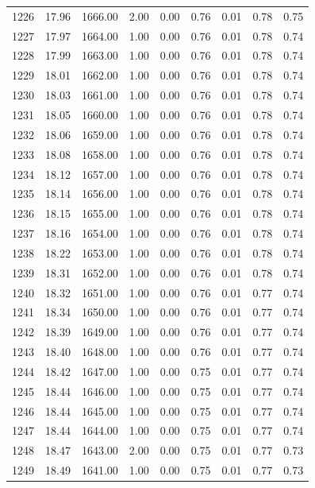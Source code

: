 \documentclass{article}\usepackage[]{graphicx}\usepackage[]{color}
\begin{document}
\begin{longtable}{rrrrrrrrr}
  1226 & 17.96 & 1666.00 & 2.00 & 0.00 & 0.76 & 0.01 & 0.78 & 0.75 \\ 
  1227 & 17.97 & 1664.00 & 1.00 & 0.00 & 0.76 & 0.01 & 0.78 & 0.74 \\ 
  1228 & 17.99 & 1663.00 & 1.00 & 0.00 & 0.76 & 0.01 & 0.78 & 0.74 \\ 
  1229 & 18.01 & 1662.00 & 1.00 & 0.00 & 0.76 & 0.01 & 0.78 & 0.74 \\ 
  1230 & 18.03 & 1661.00 & 1.00 & 0.00 & 0.76 & 0.01 & 0.78 & 0.74 \\ 
  1231 & 18.05 & 1660.00 & 1.00 & 0.00 & 0.76 & 0.01 & 0.78 & 0.74 \\ 
  1232 & 18.06 & 1659.00 & 1.00 & 0.00 & 0.76 & 0.01 & 0.78 & 0.74 \\ 
  1233 & 18.08 & 1658.00 & 1.00 & 0.00 & 0.76 & 0.01 & 0.78 & 0.74 \\ 
  1234 & 18.12 & 1657.00 & 1.00 & 0.00 & 0.76 & 0.01 & 0.78 & 0.74 \\ 
  1235 & 18.14 & 1656.00 & 1.00 & 0.00 & 0.76 & 0.01 & 0.78 & 0.74 \\ 
  1236 & 18.15 & 1655.00 & 1.00 & 0.00 & 0.76 & 0.01 & 0.78 & 0.74 \\ 
  1237 & 18.16 & 1654.00 & 1.00 & 0.00 & 0.76 & 0.01 & 0.78 & 0.74 \\ 
  1238 & 18.22 & 1653.00 & 1.00 & 0.00 & 0.76 & 0.01 & 0.78 & 0.74 \\ 
  1239 & 18.31 & 1652.00 & 1.00 & 0.00 & 0.76 & 0.01 & 0.78 & 0.74 \\ 
  1240 & 18.32 & 1651.00 & 1.00 & 0.00 & 0.76 & 0.01 & 0.77 & 0.74 \\ 
  1241 & 18.34 & 1650.00 & 1.00 & 0.00 & 0.76 & 0.01 & 0.77 & 0.74 \\ 
  1242 & 18.39 & 1649.00 & 1.00 & 0.00 & 0.76 & 0.01 & 0.77 & 0.74 \\ 
  1243 & 18.40 & 1648.00 & 1.00 & 0.00 & 0.76 & 0.01 & 0.77 & 0.74 \\ 
  1244 & 18.42 & 1647.00 & 1.00 & 0.00 & 0.75 & 0.01 & 0.77 & 0.74 \\ 
  1245 & 18.44 & 1646.00 & 1.00 & 0.00 & 0.75 & 0.01 & 0.77 & 0.74 \\ 
  1246 & 18.44 & 1645.00 & 1.00 & 0.00 & 0.75 & 0.01 & 0.77 & 0.74 \\ 
  1247 & 18.44 & 1644.00 & 1.00 & 0.00 & 0.75 & 0.01 & 0.77 & 0.74 \\ 
  1248 & 18.47 & 1643.00 & 2.00 & 0.00 & 0.75 & 0.01 & 0.77 & 0.73 \\ 
  1249 & 18.49 & 1641.00 & 1.00 & 0.00 & 0.75 & 0.01 & 0.77 & 0.73 \\ 

\end{longtable}
\end{document}
